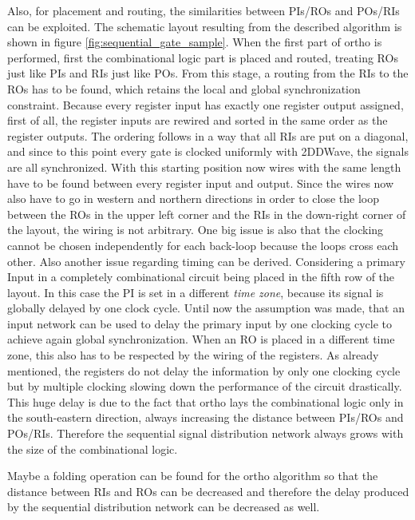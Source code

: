 Also, for placement and routing, the similarities between PIs/ROs and POs/RIs can be exploited. The schematic layout resulting from the described algorithm is shown in figure \ref{fig:sequential_gate_sample}. When the first part of ortho is performed, first the combinational logic part is placed and routed, treating ROs just like PIs and RIs just like POs. From this stage, a routing from the RIs to the ROs has to be found, which retains the local and global synchronization constraint. Because every register input has exactly one register output assigned, first of all, the register inputs are rewired and sorted in the same order as the register outputs. The ordering follows in a way that all RIs are put on a diagonal, and since to this point every gate is clocked uniformly with 2DDWave, the signals are all synchronized. With this starting position now wires with the same length have to be found between every register input and output. Since the wires now also have to go in western and northern directions in order to close the loop between the ROs in the upper left corner and the RIs in the down-right corner of the layout, the wiring is not arbitrary. One big issue is also that the clocking cannot be chosen independently for each back-loop because the loops cross each other. Also another issue regarding timing can be derived. Considering a primary Input in a completely combinational circuit being placed in the fifth row of the layout. In this case the PI is set in a different \textit{time zone}, because its signal is globally delayed by one clock cycle. Until now the assumption was made, that an input network can be used to delay the primary input by one clocking cycle to achieve again global synchronization. When an RO is placed in a different time zone, this also has to be respected by the wiring of the registers. As already mentioned, the registers do not delay the information by only one clocking cycle but by multiple clocking slowing down the performance of the circuit drastically. This huge delay is due to the fact that ortho lays the combinational logic only in the south-eastern direction, always increasing the distance between PIs/ROs and POs/RIs. Therefore the sequential signal distribution network always grows with the size of the combinational logic.

Maybe a folding operation can be found for the ortho algorithm so that the distance between RIs and ROs can be decreased and therefore the delay produced by the sequential distribution network can be decreased as well.

